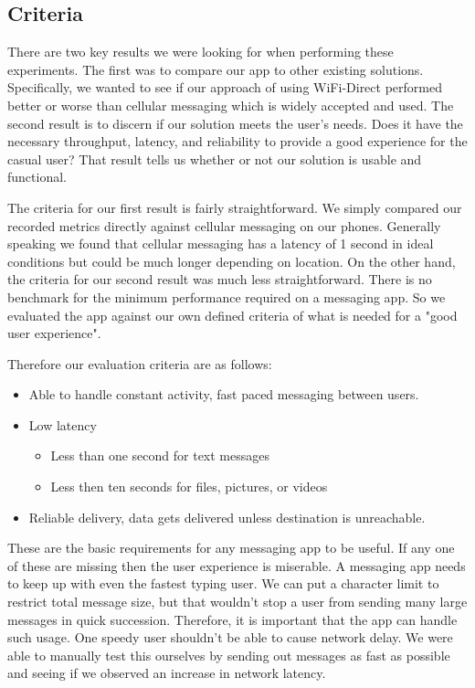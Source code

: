 \documentclass[10pt]{article}
\begin{document}
\subsection{Criteria}

There are two key results we were looking for when performing these experiments. The first was to compare our app to other existing solutions. Specifically, we wanted to see if our approach of using WiFi-Direct performed better or worse than cellular messaging which is widely accepted and used. The second result is to discern if our solution meets the user's needs. Does it have the necessary throughput, latency, and reliability to provide a good experience for the casual user? That result tells us whether or not our solution is usable and functional.

The criteria for our first result is fairly straightforward. We simply compared our recorded metrics directly against cellular messaging on our phones. Generally speaking we found that cellular messaging has a latency of 1 second in ideal conditions but could be much longer depending on location. On the other hand, the criteria for our second result was much less straightforward. There is no benchmark for the minimum performance required on a messaging app. So we evaluated the app against our own defined criteria of what is needed for a "good user experience".

Therefore our evaluation criteria are as follows:
\begin{itemize}
    \item Able to handle constant activity, fast paced messaging between users.
    \item Low latency
          \begin{itemize}
              \item Less than one second for text messages
              \item Less then ten seconds for files, pictures, or videos
          \end{itemize}
    \item Reliable delivery, data gets delivered unless destination is unreachable.
\end{itemize}

These are the basic requirements for any messaging app to be useful. If any one of these are missing then the user experience is miserable.
A messaging app needs to keep up with even the fastest typing user. We can put a character limit to restrict total message size, but that wouldn't stop a user from sending many large messages in quick succession. Therefore, it is important that the app can handle such usage. One speedy user shouldn't be able to cause network delay. We were able to manually test this ourselves by sending out messages as fast as possible and seeing if we observed an increase in network latency.
\end{document}
